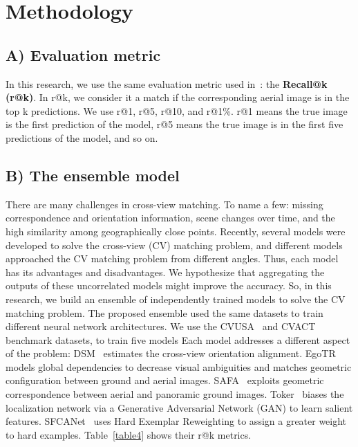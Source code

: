 \documentclass[10pt,letterpaper]{article}
\begin{document}
\section*{Methodology}
\subsection*{A) Evaluation metric}
In this research, we use the same evaluation metric used in~\cite{bib3,bib4,bib5,bib8,bib13,bib14,bib17,bib18,bib19,bib20,bib21,bib22,bib24,bib36,bib43,bib44,bib45,bib46,bib47,bib49,bib50}: the {\bf Recall@k (r@k)}. In r@k, we consider it a match if the corresponding aerial image is in the top k predictions. We use r@1, r@5, r@10, and r@1\%. r@1 means the true image is the first prediction of the model, r@5 means the true image is in the first five predictions of the model, and so on.

\subsection*{B) The ensemble model}

There are many challenges in cross-view matching. To name a few:  missing correspondence and orientation information, scene changes over time, and the high similarity among geographically close points. Recently, several models were developed to solve the cross-view (CV) matching problem, and different models approached the CV matching problem from different angles. Thus, each model has its advantages and disadvantages. We hypothesize that aggregating the outputs of these uncorrelated models might improve the accuracy.
So, in this research, we build an ensemble of independently trained models to solve the CV matching problem. The proposed ensemble used the same datasets to train different neural network architectures. We use the CVUSA~\cite{bib55} and CVACT~\cite{bib4} benchmark datasets, to train five models Each model addresses a  different aspect of the problem: DSM~\cite{bib13} estimates the cross-view orientation alignment.  EgoTR~\cite{bib19} models global dependencies to decrease visual ambiguities and matches geometric configuration between ground and aerial images. SAFA~\cite{bib46} exploits geometric correspondence between aerial and panoramic ground images. Toker~\cite{bib18} biases the localization network via a Generative Adversarial Network (GAN) to learn salient features. SFCANet~\cite{bib45} uses Hard Exemplar Reweighting to assign a greater weight to hard examples. Table~\ref{table4} shows their r@k metrics.
\end{document}
